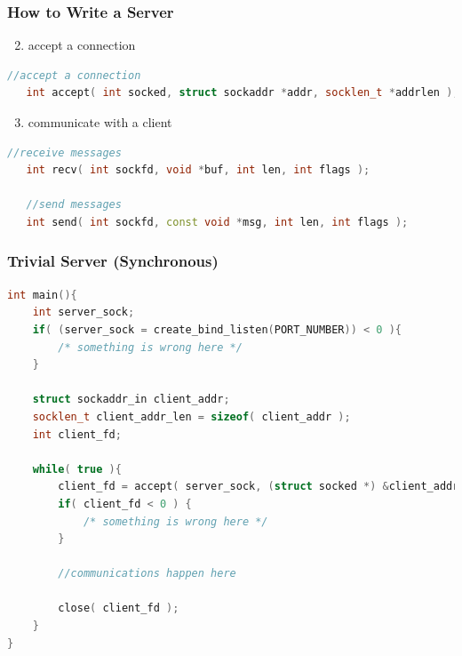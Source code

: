 \documentclass[aspectratio=43]{beamer}
\begin{document}
\begin{frame}[fragile]
  \frametitle{How to Write a Server}

   \begin{enumerate}
   \setcounter{enumi}{1}
   \item accept a connection
    \end{enumerate}
    \begin{lstlisting}[language=C++,basicstyle=\ttfamily\footnotesize,commentstyle=\color{commgreen},keywordstyle=\color{blue},breaklines=true]
   //accept a connection
   int accept( int socked, struct sockaddr *addr, socklen_t *addrlen );
   \end{lstlisting}
   
   \begin{enumerate}
   \setcounter{enumi}{2}
   \item communicate with a client
   \end{enumerate}
   
   \begin{lstlisting}[language=C++,basicstyle=\ttfamily\footnotesize,commentstyle=\color{commgreen},keywordstyle=\color{blue},breaklines=true]
   //receive messages
   int recv( int sockfd, void *buf, int len, int flags );
   
   //send messages
   int send( int sockfd, const void *msg, int len, int flags );
   \end{lstlisting}
\end{frame}

\begin{frame}[fragile]
  \frametitle{Trivial Server (Synchronous)}

\begin{lstlisting}[language=C++,basicstyle=\ttfamily\footnotesize,commentstyle=\color{commgreen},keywordstyle=\color{blue},breaklines=true]
int main(){
    int server_sock;
    if( (server_sock = create_bind_listen(PORT_NUMBER)) < 0 ){
        /* something is wrong here */
    }
    
    struct sockaddr_in client_addr;
    socklen_t client_addr_len = sizeof( client_addr );
    int client_fd;
    
    while( true ){
        client_fd = accept( server_sock, (struct socked *) &client_addr, &client_addr_len );
        if( client_fd < 0 ) {
            /* something is wrong here */
        }
        
        //communications happen here
        
        close( client_fd );
    }
}
   \end{lstlisting}
\end{frame}
\end{document}

